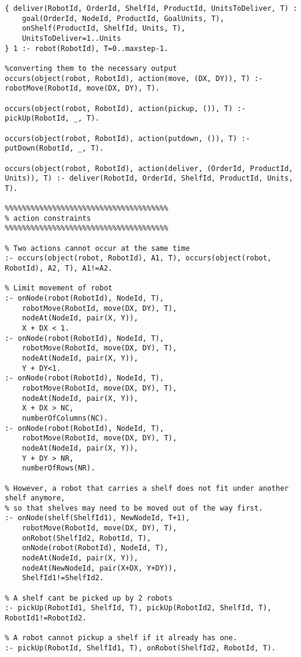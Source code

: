 \documentclass[letterpaper]{article} %
\begin{document}
\begin{lstlisting}[numbers=none,language=clingo]
% Goal units are different from onShelf units
{ deliver(RobotId, OrderId, ShelfId, ProductId, UnitsToDeliver, T) : 
    goal(OrderId, NodeId, ProductId, GoalUnits, T), 
    onShelf(ProductId, ShelfId, Units, T), 
    UnitsToDeliver=1..Units
} 1 :- robot(RobotId), T=0..maxstep-1.

%converting them to the necessary output
occurs(object(robot, RobotId), action(move, (DX, DY)), T) :- robotMove(RobotId, move(DX, DY), T).

occurs(object(robot, RobotId), action(pickup, ()), T) :- pickUp(RobotId, _, T).

occurs(object(robot, RobotId), action(putdown, ()), T) :- putDown(RobotId, _, T).

occurs(object(robot, RobotId), action(deliver, (OrderId, ProductId, Units)), T) :- deliver(RobotId, OrderId, ShelfId, ProductId, Units, T).

%%%%%%%%%%%%%%%%%%%%%%%%%%%%%%%%%%%%%%
% action constraints
%%%%%%%%%%%%%%%%%%%%%%%%%%%%%%%%%%%%%%

% Two actions cannot occur at the same time
:- occurs(object(robot, RobotId), A1, T), occurs(object(robot, RobotId), A2, T), A1!=A2.

% Limit movement of robot
:- onNode(robot(RobotId), NodeId, T), 
    robotMove(RobotId, move(DX, DY), T),
    nodeAt(NodeId, pair(X, Y)), 
    X + DX < 1.
:- onNode(robot(RobotId), NodeId, T), 
    robotMove(RobotId, move(DX, DY), T),
    nodeAt(NodeId, pair(X, Y)), 
    Y + DY<1.
:- onNode(robot(RobotId), NodeId, T), 
    robotMove(RobotId, move(DX, DY), T),
    nodeAt(NodeId, pair(X, Y)), 
    X + DX > NC,
    numberOfColumns(NC).
:- onNode(robot(RobotId), NodeId, T), 
    robotMove(RobotId, move(DX, DY), T),
    nodeAt(NodeId, pair(X, Y)), 
    Y + DY > NR,
    numberOfRows(NR).

% However, a robot that carries a shelf does not fit under another shelf anymore, 
% so that shelves may need to be moved out of the way first.
:- onNode(shelf(ShelfId1), NewNodeId, T+1),
    robotMove(RobotId, move(DX, DY), T),
    onRobot(ShelfId2, RobotId, T),
    onNode(robot(RobotId), NodeId, T),
    nodeAt(NodeId, pair(X, Y)),
    nodeAt(NewNodeId, pair(X+DX, Y+DY)),
    ShelfId1!=ShelfId2.

% A shelf cant be picked up by 2 robots
:- pickUp(RobotId1, ShelfId, T), pickUp(RobotId2, ShelfId, T), RobotId1!=RobotId2.

% A robot cannot pickup a shelf if it already has one.
:- pickUp(RobotId, ShelfId1, T), onRobot(ShelfId2, RobotId, T).


\end{lstlisting}
\end{document}
